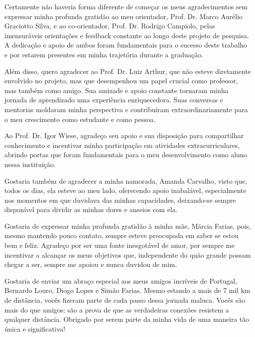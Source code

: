 
\begin{agradecimentos}%

Certamente não haveria forma diferente de começar os meus agradecimentos sem expressar minha profunda gratidão ao meu orientador, Prof. Dr. Marco Aurélio Graciotto Silva, e ao co-orientador, Prof. Dr. Rodrigo Campiolo, pelas imensuráveis orientações e feedback constante ao longo deste projeto de pesquisa. A dedicação e apoio de ambos foram fundamentais para o sucesso deste trabalho e por estarem presentes em minha trajetória durante a graduação.

Além disso, quero agradecer ao Prof. Dr. Luiz Arthur, que não esteve diretamente envolvido no projeto, mas que desempenhou um papel crucial como professor, mas também como amigo. Sua amizade e apoio constante tornaram minha jornada de aprendizado uma experiência enriquecedora. Suas conversas e mentorias moldaram minha perspectiva e contribuíram extraordinariamente para o meu crescimento como estudante e como pessoa.

Ao Prof. Dr. Igor Wiese, agradeço seu apoio e sua disposição para compartilhar conhecimento e incentivar minha participação em atividades extracurriculares, abrindo portas que foram fundamentais para o meu desenvolvimento como aluno nessa instituição.

Gostaria também de agradecer a minha namorada, Amanda Carvalho, visto que, todos os dias, ela esteve ao meu lado, oferecendo apoio inabalável, especialmente nos momentos em que duvidava das minhas capacidades, deixando-se sempre disponível para dividir as minhas dores e anseios com ela.

Gostaria de expressar minha profunda gratidão à minha mãe, Márcia Farias, pois, mesmo mantendo pouco contato, sempre esteve preocupada em saber se estou bem e feliz. Agradeço por ser uma fonte inesgotável de amor, por sempre me incentivar a alcançar os meus objetivos que, independente do quão grande possam chegar a ser, sempre me apoiou e nunca duvidou de mim.

Gostaria de enviar um abraço especial aos meus amigos incríveis de Portugal, Bernardo Louro, Diogo Lopes e Simão Farias. Mesmo estando a mais de 7 mil km de distância, vocês fizeram parte de cada passo dessa jornada maluca. Vocês são mais do que amigos; são a prova de que as verdadeiras conexões resistem a qualquer distância. Obrigado por serem parte da minha vida de uma maneira tão única e significativa!


\end{agradecimentos}
